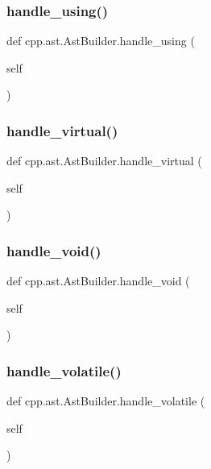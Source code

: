 \subsubsection{\texorpdfstring{handle\_using()}{handle\_using()}}
{\footnotesize\ttfamily def cpp.\+ast.\+Ast\+Builder.\+handle\+\_\+using (\begin{DoxyParamCaption}\item[{}]{self }\end{DoxyParamCaption})}

\mbox{\label{classcpp_1_1ast_1_1_ast_builder_a44710dc0b8e5bdbecaa56f7c4b59c046}} 
\subsubsection{\texorpdfstring{handle\_virtual()}{handle\_virtual()}}
{\footnotesize\ttfamily def cpp.\+ast.\+Ast\+Builder.\+handle\+\_\+virtual (\begin{DoxyParamCaption}\item[{}]{self }\end{DoxyParamCaption})}

\mbox{\label{classcpp_1_1ast_1_1_ast_builder_a7a8f94909d4080bad2bc5dabd934057b}} 
\subsubsection{\texorpdfstring{handle\_void()}{handle\_void()}}
{\footnotesize\ttfamily def cpp.\+ast.\+Ast\+Builder.\+handle\+\_\+void (\begin{DoxyParamCaption}\item[{}]{self }\end{DoxyParamCaption})}

\mbox{\label{classcpp_1_1ast_1_1_ast_builder_a2dfb23ddeb05e1017b3d1ce85a40cacb}} 
\subsubsection{\texorpdfstring{handle\_volatile()}{handle\_volatile()}}
{\footnotesize\ttfamily def cpp.\+ast.\+Ast\+Builder.\+handle\+\_\+volatile (\begin{DoxyParamCaption}\item[{}]{self }\end{DoxyParamCaption})}

